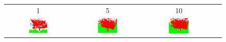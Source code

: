     \begin{figure}[h!]
        \begin{tabular}{cccc}
            1 & 5 & 10 \\
            \includegraphics[width=0.30\textwidth, height=0.15\textheight]{images/seg_output/deep_ensembles/1_1.png} &
            \includegraphics[width=0.30\textwidth, height=0.15\textheight]{images/seg_output/deep_ensembles/1_5.png}& 
            \includegraphics[width=0.30\textwidth, height=0.15\textheight]{images/seg_output/deep_ensembles/1_10.png}\\


\end{tabular}
\end{figure}
